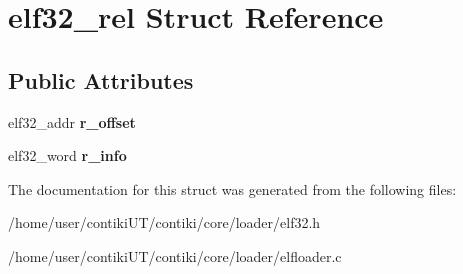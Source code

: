 \hypertarget{structelf32__rel}{}\section{elf32\+\_\+rel Struct Reference}
\label{structelf32__rel}
\subsection*{Public Attributes}
\begin{DoxyCompactItemize}
\item 
\hypertarget{structelf32__rel_a2bea1d7ef2a0c148cd9ae21386721f40}{}elf32\+\_\+addr {\bfseries r\+\_\+offset}\label{structelf32__rel_a2bea1d7ef2a0c148cd9ae21386721f40}

\item 
\hypertarget{structelf32__rel_ac93ab16d071b87719651f517893bba97}{}elf32\+\_\+word {\bfseries r\+\_\+info}\label{structelf32__rel_ac93ab16d071b87719651f517893bba97}

\end{DoxyCompactItemize}


The documentation for this struct was generated from the following files\+:\begin{DoxyCompactItemize}
\item 
/home/user/contiki\+U\+T/contiki/core/loader/elf32.\+h\item 
/home/user/contiki\+U\+T/contiki/core/loader/elfloader.\+c\end{DoxyCompactItemize}
